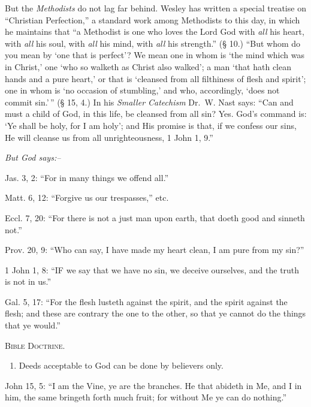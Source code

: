\documentclass[
]{book}
\providecommand{\tightlist}{%
  \setlength{\itemsep}{0pt}\setlength{\parskip}{0pt}}
\begin{document}
But the \emph{Methodists} do not lag far behind. Wesley has written a special treatise on ``Christian Perfection,'' a standard work among Methodists to this day, in which he maintains that ``a Methodist is one who loves the Lord God with \emph{all} his heart, with \emph{all} his soul, with \emph{all} his mind, with \emph{all} his strength.'' (§ 10.) ``But whom do you mean by `one that is perfect'? We mean one in whom is `the mind which was in Christ,' one `who so walketh as Christ also walked'; a man `that hath clean hands and a pure heart,' or that is `cleansed from all filthiness of flesh and spirit'; one in whom is `no occasion of stumbling,' and who, accordingly, `does not commit sin.'\,'' (§ 15, 4.) In his \emph{Smaller Catechism} Dr.~W. Nast says: ``Can and must a child of God, in this life, be cleansed from all sin? Yes. God's command is: `Ye shall be holy, for I am holy'; and His promise is that, if we confess our sins, He will cleanse us from all unrighteousness, 1 John 1, 9.''

\begin{center}
\textsl{But God says:--}
\end{center}

Jas. 3, 2: ``For in many things we offend all.''

Matt. 6, 12: ``Forgive us our trespasses,'' etc.

Eccl. 7, 20: ``For there is not a just man upon earth, that doeth good and sinneth not.''

Prov. 20, 9: ``Who can say, I have made my heart clean, I am pure from my sin?''

1 John 1, 8: ``IF we say that we have no sin, we deceive ourselves, and the truth is not in us.''

Gal. 5, 17: ``For the flesh lusteth against the spirit, and the spirit against the flesh; and these are contrary the one to the other, so that ye cannot do the things that ye would.''

\begin{center}
\textsc{Bible Doctrine.}
\end{center}

\begin{enumerate}
\def\labelenumi{\alph{enumi}.}
\setcounter{enumi}{1}
\tightlist
\item
  Deeds acceptable to God can be done by believers only.
\end{enumerate}

John 15, 5: ``I am the Vine, ye are the branches. He that abideth in Me, and I in him, the same bringeth forth much fruit; for without Me ye can do nothing.''
\end{document}
